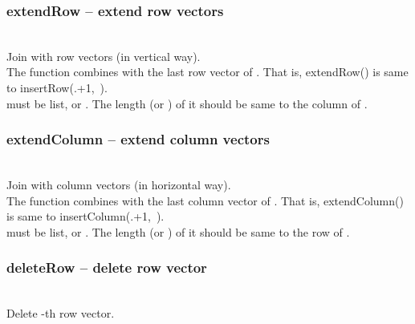   \subsubsection{extendRow -- extend row vectors}
   \\
   \spacing
   \quad Join  with row vectors  (in vertical way).\\
   \spacing
   \quad The function combines  with the last row vector of .
   That is, extendRow() is same to insertRow(.+1,\ ).\\
   \spacing
    must be list,  or .
    The length (or ) of it should be same to the column of . 
  \subsubsection{extendColumn -- extend column vectors}
   \\
   \spacing
   \quad Join  with column vectors  (in horizontal way).\\
   \spacing
   \quad The function combines  with the last column vector of .
   That is, extendColumn() is same to insertColumn(.+1,\ ).\\
   \spacing
    must be list,  or .
    The length (or ) of it should be same to the row of .
  \subsubsection{deleteRow -- delete row vector}
   \\
   \spacing
   \quad Delete -th row vector.\\
   \spacing

